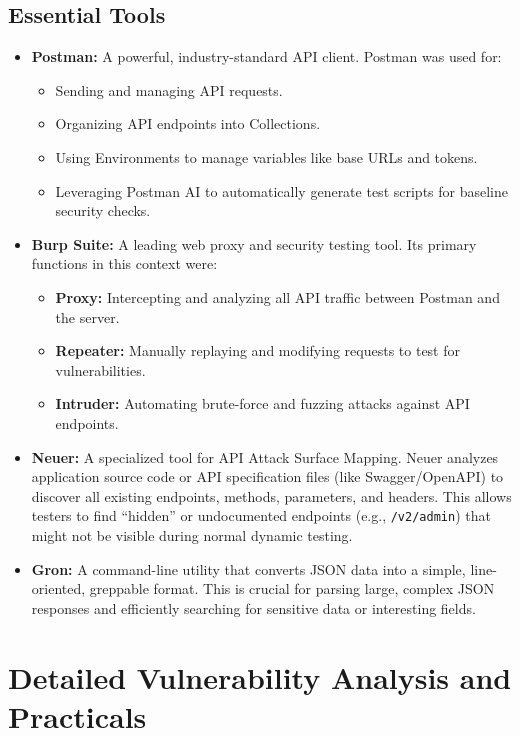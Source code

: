 \documentclass[12pt]{article}
\begin{document}
\subsection*{Essential Tools}
\begin{itemize}
  \item \textbf{Postman:} A powerful, industry-standard API client. Postman was used for:
  \begin{itemize}
    \item Sending and managing API requests.
    \item Organizing API endpoints into Collections.
    \item Using Environments to manage variables like base URLs and tokens.
    \item Leveraging Postman AI to automatically generate test scripts for baseline security checks.
  \end{itemize}

  \item \textbf{Burp Suite:} A leading web proxy and security testing tool. Its primary functions in this context were:
  \begin{itemize}
    \item \textbf{Proxy:} Intercepting and analyzing all API traffic between Postman and the server.
    \item \textbf{Repeater:} Manually replaying and modifying requests to test for vulnerabilities.
    \item \textbf{Intruder:} Automating brute-force and fuzzing attacks against API endpoints.
  \end{itemize}

  \item \textbf{Neuer:} A specialized tool for API Attack Surface Mapping. Neuer analyzes
  application source code or API specification files (like Swagger/OpenAPI) to discover
  all existing endpoints, methods, parameters, and headers. This allows testers to find
  ``hidden'' or undocumented endpoints (e.g., \texttt{/v2/admin}) that might not be visible during
  normal dynamic testing.

  \item \textbf{Gron:} A command-line utility that converts JSON data into a simple, line-oriented,
  greppable format. This is crucial for parsing large, complex JSON responses and
  efficiently searching for sensitive data or interesting fields.
\end{itemize}

\section{Detailed Vulnerability Analysis and Practicals}
\end{document}
